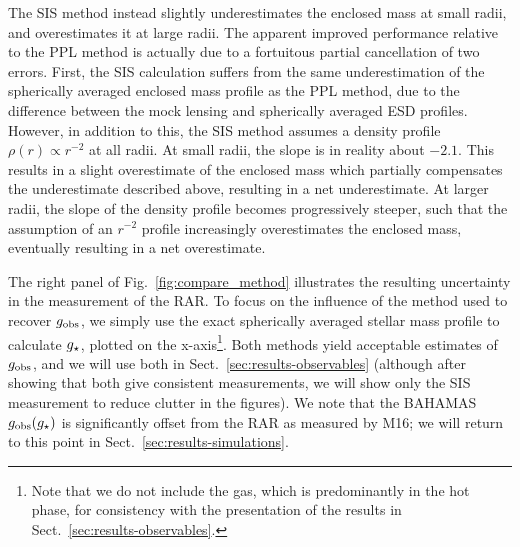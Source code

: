 \documentclass[usenatbib]{mnras}
\newcommand{\un}[1]{_{\rm #1}}
\newcommand{\dex}{\, {\rm dex}}
\begin{document}
The SIS method instead slightly underestimates the enclosed mass at small radii, and overestimates it at large radii. The apparent improved performance relative to the PPL method is actually due to a fortuitous partial cancellation of two errors. First, the SIS calculation suffers from the same underestimation of the spherically averaged enclosed mass profile as the PPL method, due to the difference between the mock lensing and spherically averaged ESD profiles. However, in addition to this, the SIS method assumes a density profile $\rho(r)\propto r^{-2}$ at all radii. At small radii, the slope is in reality about $-2.1$. This results in a slight overestimate of the enclosed mass which partially compensates the underestimate described above, resulting in a net underestimate. At larger radii, the slope of the density profile becomes progressively steeper, such that the assumption of an $r^{-2}$ profile increasingly overestimates the enclosed mass, eventually resulting in a net overestimate.

The right panel of Fig.~\ref{fig:compare_method} illustrates the resulting uncertainty in the measurement of the RAR. To focus on the influence of the method used to recover $g\un{obs}$, we simply use the exact spherically averaged stellar mass profile to calculate $g\un{\star}$, plotted on the x-axis\footnote{Note that we do not include the gas, which is predominantly in the hot phase, for consistency with the presentation of the results in Sect.~\ref{sec:results-observables}.}. Both methods yield acceptable estimates of $g\un{obs}$, and we will use both in Sect.~\ref{sec:results-observables} (although after showing that both give consistent measurements, we will show only the SIS measurement to reduce clutter in the figures). We note that the BAHAMAS $g\un{obs}(g\un{\star})$ is significantly offset from the RAR as measured by M16; we will return to this point in Sect.~\ref{sec:results-simulations}.

\end{document}
